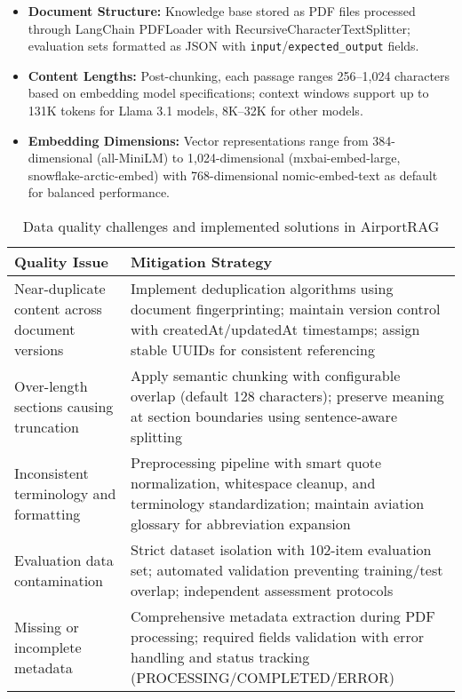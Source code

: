 \begin{itemize}
  \item \textbf{Document Structure:} Knowledge base stored as PDF files processed through LangChain PDFLoader with RecursiveCharacterTextSplitter; evaluation sets formatted as JSON with \texttt{input}/\texttt{expected\_output} fields.
  \item \textbf{Content Lengths:} Post-chunking, each passage ranges 256--1{,}024 characters based on embedding model specifications; context windows support up to 131K tokens for Llama 3.1 models, 8K--32K for other models.
  \item \textbf{Embedding Dimensions:} Vector representations range from 384-dimensional (all-MiniLM) to 1{,}024-dimensional (mxbai-embed-large, snowflake-arctic-embed) with 768-dimensional nomic-embed-text as default for balanced performance.
\end{itemize}

\begin{table}[H]
\centering
\caption{Data quality challenges and implemented solutions in AirportRAG}
\label{tab:data_quality_s2}
\begin{tabular}{|p{6cm}|p{9cm}|}
\hline
\textbf{Quality Issue} & \textbf{Mitigation Strategy} \\
\hline
Near-duplicate content across document versions &
Implement deduplication algorithms using document fingerprinting; maintain version control with createdAt/updatedAt timestamps; assign stable UUIDs for consistent referencing \\
\hline
Over-length sections causing truncation &
Apply semantic chunking with configurable overlap (default 128 characters); preserve meaning at section boundaries using sentence-aware splitting \\
\hline
Inconsistent terminology and formatting &
Preprocessing pipeline with smart quote normalization, whitespace cleanup, and terminology standardization; maintain aviation glossary for abbreviation expansion \\
\hline
Evaluation data contamination &
Strict dataset isolation with 102-item evaluation set; automated validation preventing training/test overlap; independent assessment protocols \\
\hline
Missing or incomplete metadata &
Comprehensive metadata extraction during PDF processing; required fields validation with error handling and status tracking (PROCESSING/COMPLETED/ERROR) \\
\hline
\end{tabular}
\end{table}

